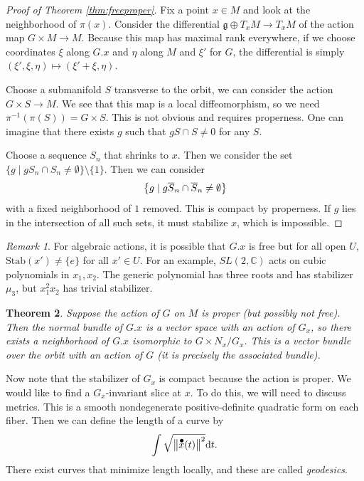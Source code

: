 \documentclass[leqno, openany]{memoir}
\newtheorem{thm}{Theorem}[section]
\theoremstyle{definition}
\theoremstyle{remark}
\newtheorem{rmk}[thm]{Remark}
\theoremstyle{plain}
\theoremstyle{definition}
\theoremstyle{remark}
\newcommand{\C}{\mathbb{C}}
\newcommand*{\dt}[1]{%
   \accentset{\mbox{\Huge\bfseries .}}{#1}}
\newcommand{\mf}[1]{\mathfrak{#1}}
\newcommand{\mr}[1]{\mathrm{#1}}
\newcommand{\ol}[1]{\overline{#1}}
\begin{document}
\begin{proof}[Proof of Theorem \ref{thm:freeproper}]
    Fix a point $x \in M$ and look at the neighborhood of $\pi(x)$. Consider the differential $\mf{g} \oplus T_x M \to T_x M$ of the action map $G \times M \to M$. Because this map has maximal rank everywhere, if we choose coordinates $\xi$ along $G.x$ and $\eta$ along $M$ and $\xi'$ for $G$, the differential is simply $(\xi',\xi,\eta) \mapsto (\xi'+\xi, \eta)$.

    Choose a submanifold $S$ transverse to the orbit, we can consider the action $G \times S \to M$. We see that this map is a local diffeomorphism, so we need $\pi^{-1}(\pi(S)) = G \times S$. This is not obvious and requires properness. One can imagine that there exists $g$ such that $gS \cap S \neq 0$ for any $S$. 

    Choose a sequence $S_n$ that shrinks to $x$. Then we consider the set $\{ g \mid g S_n \cap S_n \neq \emptyset \} \setminus \{1 \}$. Then we can consider
    \[ \qty{ g \mid g \ol{S}_n \cap \ol{S}_n \neq \emptyset } \]
    with a fixed neighborhood of $1$ removed. This is compact by properness. If $g$ lies in the intersection of all such sets, it must stabilize $x$, which is impossible.
\end{proof}

\begin{rmk}
    For algebraic actions, it is possible that $G.x$ is free but for all open $U$, $\mr{Stab}(x') \neq \{ e \}$ for all $x' \in U$. For an example, $SL(2,\C)$ acts on cubic polynomials in $x_1,x_2$. The generic polynomial has three roots and has stabilizer $\mu_3$, but $x_1^2 x_2$ has trivial stabilizer.
\end{rmk}

\begin{thm}
    Suppose the action of $G$ on $M$ is proper (but possibly not free). Then the normal bundle of $G.x$ is a vector space with an action of $G_x$, so there exists a neighborhood of $G.x$ isomorphic to $G \times N_x / G_x$. This is a vector bundle over the orbit with an action of $G$ (it is precisely the associated bundle).
\end{thm}

Now note that the stabilizer of $G_x$ is compact because the action is proper. We would like to find a $G_x$-invariant slice at $x$. To do this, we will need to discuss metrics. This is a smooth nondegenerate positive-definite quadratic form on each fiber. Then we can define the length of a curve by
\[ \int \sqrt{\norm{\dt{x}(t)}^2} \dd t. \]
There exist curves that minimize length locally, and these are called \textit{geodesics}. 
\end{document}
